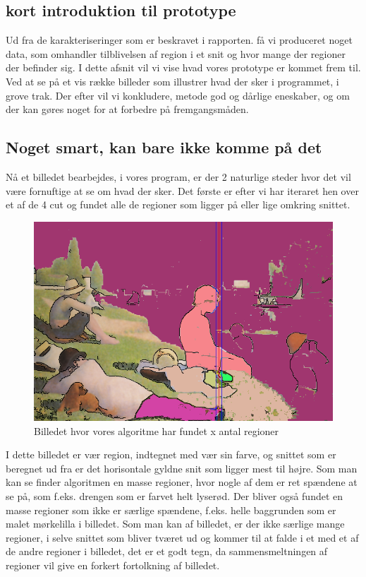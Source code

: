 \subsection{kort introduktion til prototype}
Ud fra de karakteriseringer som er beskravet i rapporten. få vi
produceret noget data, som omhandler tilblivelsen af region i et snit og
hvor mange der regioner der befinder sig. I dette afsnit vil vi vise
hvad vores prototype er kommet frem til. Ved at se på et vis række billeder
som illustrer hvad der sker i programmet, i grove trak. Der efter vil vi
konkludere, metode god og dårlige eneskaber, og om der kan gøres noget for at
forbedre på fremgangsmåden.


\subsection{Noget smart, kan bare ikke komme på det}
Nå et billedet bearbejdes, i vores program, er der 2 naturlige steder
hvor det vil være fornuftige at se om hvad der sker. Det første er efter vi har
iteraret hen over et af de 4 cut og fundet alle de regioner som ligger
på eller lige omkring snittet.

\begin{figure}[h!!]
	\begin{center}
		\includegraphics[scale=0.42,angle=0]{afsnit/afprovning/billeder/floodfillbilledet.png}
	\end{center}
	\caption[]{Billedet hvor vores algoritme har fundet x antal regioner}
	\label{ff}
\end{figure}

I dette billedet er vær region, indtegnet med vær sin farve, og snittet
som er beregnet ud fra er det horisontale gyldne snit som ligger mest
til højre. Som man kan se finder algoritmen en masse regioner, hvor
nogle af dem er ret spændene at se på, som f.eks. drengen som er farvet
helt lyserød. Der bliver også fundet en masse regioner som ikke er
særlige spændene, f.eks. helle baggrunden som er malet mørkelilla i
billedet. Som man kan af billedet, er der ikke særlige mange regioner, i
selve snittet som bliver tværet ud og kommer til at falde i et med et af
de andre regioner i billedet, det er et godt tegn, da sammensmeltningen af
regioner vil give en forkert fortolkning af billedet.

